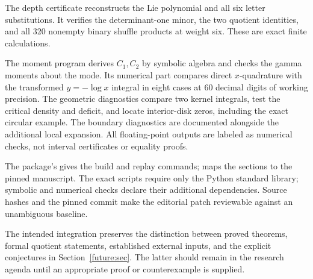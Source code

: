 The depth certificate reconstructs the Lie polynomial and all six
letter substitutions. It verifies the determinant-one minor, the
two quotient identities, and all 320 nonempty binary shuffle products
at weight six. These are exact finite calculations.

The moment program derives \(C_1,C_2\) by symbolic algebra and
checks the gamma moments about the mode. Its numerical part compares
direct \(x\)-quadrature with the transformed \(y=-\log x\) integral
in eight cases at 60 decimal digits of working precision.
The geometric diagnostics compare two kernel integrals, test the
critical density and deficit, and locate interior-disk zeros,
including the exact circular example. The boundary diagnostics
are documented alongside the additional local expansion.
All floating-point outputs are labeled as numerical checks, not
interval certificates or equality proofs.

The package's  gives the build and replay commands;
 maps the sections to the pinned
manuscript. The exact scripts require only the Python standard
library; symbolic and numerical checks declare their additional
dependencies. Source hashes and the pinned commit make the
editorial patch reviewable against an unambiguous baseline.

The intended integration preserves the distinction between proved
theorems, formal quotient statements, established external inputs,
and the explicit conjectures in Section~\ref{future:sec}.
The latter should remain in the research agenda until an appropriate
proof or counterexample is supplied.
